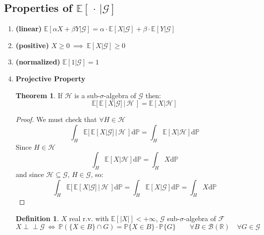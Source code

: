 \documentclass[10pt,a4paper]{article}
\theoremstyle{definition}
\newtheorem{defi}{Definition}[section]
\newtheorem{teo}{Theorem}[section]
\newcommand{\indep}{\perp \!\!\! \perp}
\begin{document}
\subsection{Properties of $\mathbb{E}[\, \cdot\, |\mathcal{G}]$}
\begin{enumerate}
	\item \textbf{(linear)} $\mathbb{E}[\alpha X+\beta Y|\mathcal{G}] = \alpha\cdot\mathbb{E}[X|\mathcal{G}]+\beta\cdot\mathbb{E}[Y|\mathcal{G}]$
	\item \textbf{(positive)} $X\geq 0 \ \implies \ \mathbb{E}[X|\mathcal{G}]\geq 0$
	\item \textbf{(normalized)} $\mathbb{E}[1|\mathcal{G}]=1$
	\item \textbf{Projective Property} 
	\begin{teo}
		If $ \mathcal{H}$ is a sub-$\sigma$-algebra of  $\mathcal{G}$ then:
		\begin{equation*}
		\mathbb{E}[\, \mathbb{E}[X|\mathcal{G}]\, |\,\mathcal{H}\,]=\mathbb{E}[ X |\mathcal{H}]
		\end{equation*}
	\end{teo}
\begin{proof}
	We must check that $\forall H \in\mathcal{H}$
	\begin{equation*}
		\int_{H}\mathbb{E}[\, \mathbb{E}[X|\mathcal{G}]\, |\,\mathcal{H}\,]\mathrm{d}\mathbb{P}=	
		\int_{H}\mathbb{E}[X|\mathcal{H}]\mathrm{d}\mathbb{P}
	\end{equation*}
Since $H\in \mathcal{H}$ 
\begin{equation*}
	\int_{H}\mathbb{E}[X|\mathcal{H}]\mathrm{d}\mathbb{P}=\int_{H}X\mathrm{d}\mathbb{P}
\end{equation*}
and since $\mathcal{H}\subseteq\mathcal{G}$, $H\in\mathcal{G}$, so:
\begin{equation*}
		\int_{H}\mathbb{E}[\, \mathbb{E}[X|\mathcal{G}]\, |\,\mathcal{H}\,]\mathrm{d}\mathbb{P}=	\int_{H}\mathbb{E}[X|\mathcal{G}]\mathrm{d}\mathbb{P}=\int_{H}X\mathrm{d}\mathbb{P}
\end{equation*}
\end{proof}
\begin{defi}
	$X$ real r.v. with $\mathbb{E}[|X|]<+\infty $,  $ \mathcal{G}$ sub-$\sigma$-algebra of  $\mathcal{F} $ 
	\begin{equation*}
		X \indep \mathcal{G} \ \iff \ \mathbb{P}\left(\{X\in B\}\cap G\right)=\mathbb{P}\{X\in B\}\cdot \mathbb{P}\{G\} \qquad \forall B \in \mathcal{B}(\mathbb{R}) \quad \forall G\in  \mathcal{G}

\end{equation*}
\end{defi}
\end{enumerate}
\end{document}

